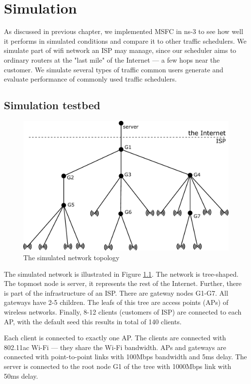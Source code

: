\chapter{Simulation}
\label{chap3}

As discussed in previous chapter, we implemented MSFC in ns-3 to see how well it performs in simulated conditions and compare it to other traffic schedulers. We simulate part of wifi network an ISP may manage, since our scheduler aims to ordinary routers at the "last mile" of the Internet --- a few hops near the customer. We simulate several types of traffic common users generate and evaluate performance of commonly used traffic schedulers. 

\section{Simulation testbed}
\label{testbed}
\begin{figure}
	\centering
	\includegraphics[width=137mm]{drawings/layout}
	\caption{The simulated network topology}
	\label{fig11:sim_layout}
\end{figure}


The simulated network is illustrated in Figure \ref{fig11:sim_layout}. The network is tree-shaped. The topmost node is server, it represents the rest of the Internet. Further, there is part of the infrastructure of an ISP. There are gateway nodes G1-G7. All gateways have 2-5 children. The leafs of this tree are access points (APs) of wireless networks. Finally, 8-12 clients (customers of ISP) are connected to each AP, with the default seed this results in total of 140 clients. 

Each client is connected to exactly one AP. The clients are connected with 802.11ac Wi-Fi --- they share the Wi-Fi bandwidth. APs and gateways are connected with point-to-point links with 100Mbps bandwidth and 5ms delay. The server is connected to the root node G1 of the tree with 1000Mbps link with 50ms delay.

